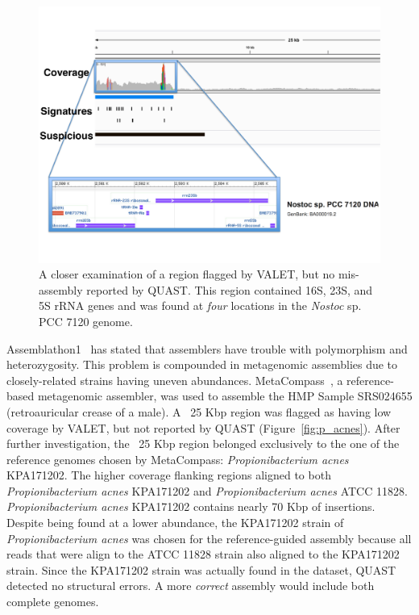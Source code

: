 \documentclass{bioinfo}
\begin{document}
\begin{figure}[tb!]
\begin{center}
\includegraphics[width=4.86in]{figures/rrna_coverages}
\end{center}
\caption[Ribosomal genes found in region marked by VALET]{A closer examination of a region flagged by VALET, but no mis-assembly reported by QUAST. This region contained 16S, 23S, and 5S rRNA genes and was found at \emph{four} locations in the \emph{Nostoc} sp. PCC 7120 genome.}
\label{fig:rrna_misassembly}
\end{figure}

Assemblathon1~\citep{earl2011assemblathon} has stated that assemblers have trouble with polymorphism and heterozygosity.
This problem is compounded in metagenomic assemblies due to closely-related strains having uneven abundances.
MetaCompass~\citep{metacompass}, a reference-based metagenomic assembler, was used to assemble the HMP Sample SRS024655 (retroauricular crease of a male).
A ~25 Kbp region was flagged as having low coverage by VALET, but not reported by QUAST (Figure~\ref{fig:p_acnes}).
After further investigation, the ~25 Kbp region belonged exclusively to the one of the reference genomes chosen by MetaCompass: \emph{Propionibacterium acnes} KPA171202.
The higher coverage flanking regions aligned to both \emph{Propionibacterium acnes} KPA171202 and \emph{Propionibacterium acnes} ATCC 11828.
\emph{Propionibacterium acnes} KPA171202 contains nearly 70 Kbp of insertions.
Despite being found at a lower abundance, the KPA171202 strain of \emph{Propionibacterium acnes} was chosen for the reference-guided assembly because all reads that were align to the ATCC 11828 strain also aligned to the KPA171202 strain.
Since the KPA171202 strain was actually found in the dataset, QUAST detected no structural errors.
A more \emph{correct} assembly would include both complete genomes.
\end{document}
